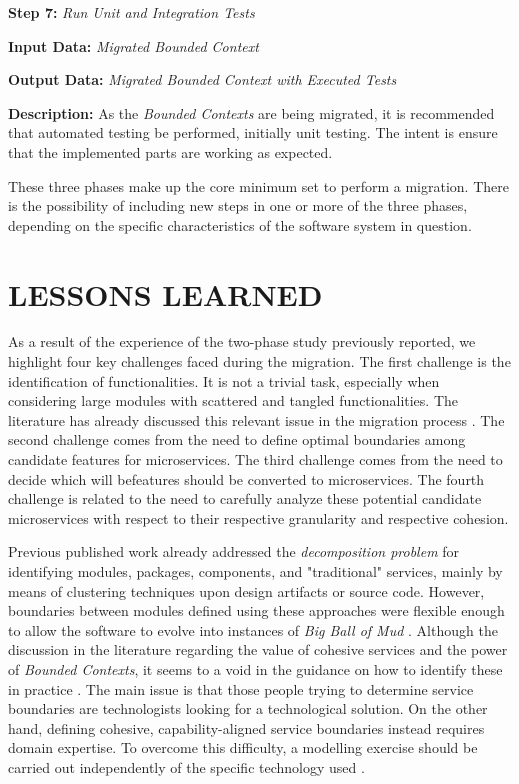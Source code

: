 \documentclass[a4paper,twoside]{article}
\begin{document}
\noindent
\textbf{Step 7:}
\textit{Run Unit and Integration Tests}

\textbf{Input Data:}
\textit{Migrated Bounded Context}

\textbf{Output Data:}
\textit{Migrated Bounded Context with Executed Tests}

\textbf{Description:} 
As the \textit{Bounded Contexts} are being migrated, it is recommended that automated testing be performed, initially unit testing. The intent is ensure that the implemented parts are working as expected.

These three phases make up the core minimum set to perform a migration. There is the possibility of including new steps in one or more of the three phases, depending on the specific characteristics of the software system in question.

\section{\uppercase{Lessons Learned}}
\label{sec:Lessons}

\noindent As a result of the experience of the two-phase study previously reported, we highlight four key challenges faced during the migration. The first challenge is the identification of functionalities. It is not a trivial task, especially when considering large modules with scattered and tangled functionalities. The literature has already discussed this relevant issue in the migration process \cite{ossher2002multi}. The second challenge comes from the need to define optimal boundaries among candidate features for microservices. The third challenge comes from the need to decide which will befeatures should be converted to microservices. The fourth challenge is related to the need to carefully analyze these potential candidate microservices with respect to their respective granularity and respective cohesion.

Previous published work already addressed the \textit{decomposition problem} for identifying modules, packages, components, and "traditional" services, mainly by means of clustering techniques upon design artifacts or source code. However, boundaries between modules defined using these approaches were flexible enough to allow the software to evolve into instances of \textit{Big Ball of Mud} \cite{foote1997big}. Although the discussion in the literature regarding the value of cohesive services and the power of \textit{Bounded Contexts}, it seems to a void in the guidance on how to identify these in practice \cite{mattmclartywebsite}. The main issue is that those people trying to determine service boundaries are technologists looking for a technological solution. On the other hand, defining cohesive, capability-aligned service boundaries instead requires domain expertise. To overcome this difficulty, a modelling exercise should be carried out independently of the specific technology used \cite{henriqueITNG2019expReport}.
\end{document}

